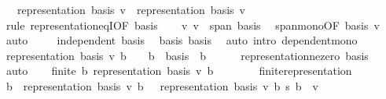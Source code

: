 \begin{isabellebody}
\ \ \ {\isachardoublequoteopen}representation\ basis\ v\ {\isacharequal}{\kern0pt}\ representation\ basis{\isacharprime}{\kern0pt}\ v{\isachardoublequoteclose}\isanewline
%
\isadelimproof
%
\endisadelimproof
%
\isatagproof
{}\isamarkupfalse%
\ {\isacharparenleft}{\kern0pt}rule\ representation{\isacharunderscore}{\kern0pt}eqI{\isacharbrackleft}{\kern0pt}OF\ basis{\isacharbrackright}{\kern0pt}{\isacharparenright}{\kern0pt}\isanewline
\ \ \isamarkupfalse%
\ v{\isacharprime}{\kern0pt}{\isacharcolon}{\kern0pt}\ {\isachardoublequoteopen}v\ {\isasymin}\ span\ basis{\isachardoublequoteclose}\ \isamarkupfalse%
\ span{\isacharunderscore}{\kern0pt}mono{\isacharbrackleft}{\kern0pt}OF\ basis{\isacharprime}{\kern0pt}{\isacharbrackright}{\kern0pt}\ v\ \isamarkupfalse%
\ auto\isanewline
\ \ \isamarkupfalse%
\ {\isacharasterisk}{\kern0pt}{\isacharcolon}{\kern0pt}\ {\isachardoublequoteopen}independent\ basis{\isacharprime}{\kern0pt}{\isachardoublequoteclose}\ \isamarkupfalse%
\ basis{\isacharprime}{\kern0pt}\ basis\ \isamarkupfalse%
\ {\isacharparenleft}{\kern0pt}auto\ intro{\isacharcolon}{\kern0pt}\ dependent{\isacharunderscore}{\kern0pt}mono{\isacharparenright}{\kern0pt}\isanewline
\ \ \isamarkupfalse%
\ {\isachardoublequoteopen}representation\ basis{\isacharprime}{\kern0pt}\ v\ b\ {\isasymnoteq}\ {}\ {\isasymLongrightarrow}\ b\ {\isasymin}\ basis{\isachardoublequoteclose}\ \ b\isanewline
\ \ \ \ \isamarkupfalse%
\ representation{\isacharunderscore}{\kern0pt}ne{\isacharunderscore}{\kern0pt}zero\ basis{\isacharprime}{\kern0pt}\ \isamarkupfalse%
\ auto\isanewline
\ \ \isamarkupfalse%
\ {\isachardoublequoteopen}finite\ {\isacharbraceleft}{\kern0pt}b{\isachardot}{\kern0pt}\ representation\ basis{\isacharprime}{\kern0pt}\ v\ b\ {\isasymnoteq}\ {}{\isacharbraceright}{\kern0pt}{\isachardoublequoteclose}\isanewline
\ \ \ \ \isamarkupfalse%
\ finite{\isacharunderscore}{\kern0pt}representation\ \isacommand{{\isachardot}{\kern0pt}}\isamarkupfalse%
\isanewline
\ \ \isamarkupfalse%
\ {\isachardoublequoteopen}{\isacharparenleft}{\kern0pt}{\isasymSum}b\ {\isacharbar}{\kern0pt}\ representation\ basis{\isacharprime}{\kern0pt}\ v\ b\ {\isasymnoteq}\ {}{\isachardot}{\kern0pt}\ representation\ basis{\isacharprime}{\kern0pt}\ v\ b\ {\isacharasterisk}{\kern0pt}s\ b{\isacharparenright}{\kern0pt}\ {\isacharequal}{\kern0pt}\ v{\isachardoublequoteclose}\isanewline

\end{isabellebody}
